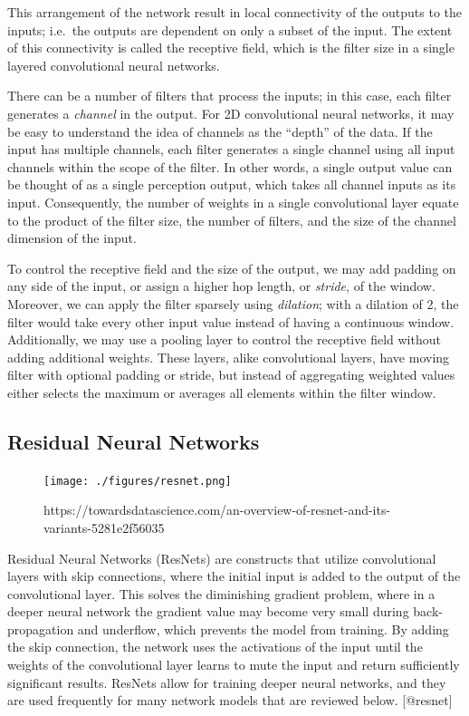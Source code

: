 \documentclass[12pt,a4paper,]{report}
\begin{document}
This arrangement of the network result in local connectivity of the
outputs to the inputs; i.e.~the outputs are dependent on only a subset
of the input. The extent of this connectivity is called the receptive
field, which is the filter size in a single layered convolutional neural
networks.

There can be a number of filters that process the inputs; in this case,
each filter generates a \emph{channel} in the output. For 2D
convolutional neural networks, it may be easy to understand the idea of
channels as the ``depth'' of the data. If the input has multiple
channels, each filter generates a single channel using all input
channels within the scope of the filter. In other words, a single output
value can be thought of as a single perception output, which takes all
channel inputs as its input. Consequently, the number of weights in a
single convolutional layer equate to the product of the filter size, the
number of filters, and the size of the channel dimension of the input.

To control the receptive field and the size of the output, we may add
padding on any side of the input, or assign a higher hop length, or
\emph{stride}, of the window. Moreover, we can apply the filter sparsely
using \emph{dilation}; with a dilation of 2, the filter would take every
other input value instead of having a continuous window. Additionally,
we may use a pooling layer to control the receptive field without adding
additional weights. These layers, alike convolutional layers, have
moving filter with optional padding or stride, but instead of
aggregating weighted values either selects the maximum or averages all
elements within the filter window.

\hypertarget{residual-neural-networks}{%
\subsection{Residual Neural Networks}\label{residual-neural-networks}}

\begin{figure}[h]
    \texttt{[image: ./figures/resnet.png]}
    \centering
    \caption{https://towardsdatascience.com/an-overview-of-resnet-and-its-variants-5281e2f56035}
\end{figure}

Residual Neural Networks (ResNets) are constructs that utilize
convolutional layers with skip connections, where the initial input is
added to the output of the convolutional layer. This solves the
diminishing gradient problem, where in a deeper neural network the
gradient value may become very small during back-propagation and
underflow, which prevents the model from training. By adding the skip
connection, the network uses the activations of the input until the
weights of the convolutional layer learns to mute the input and return
sufficiently significant results. ResNets allow for training deeper
neural networks, and they are used frequently for many network models
that are reviewed below. {[}@resnet{]}
\end{document}
